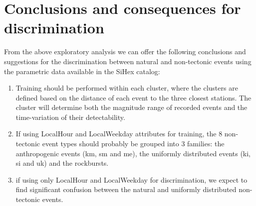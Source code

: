 \section{Conclusions and consequences for discrimination}
From the above exploratory analysis we can offer the following conclusions and
suggestions for the discrimination between natural and non-tectonic events
using the parametric data available in the SiHex catalog:
\begin{enumerate}
\item Training should be performed within each cluster, where the clusters are
defined based on the distance of each event to the three closest stations. The
cluster will determine both the magnitude range of recorded events and the
time-variation of their detectability.
\item If using LocalHour and LocalWeekday attributes for training, the 8
non-tectonic event types should probably be grouped into 3 families: the
anthropogenic events (km, sm and me), the uniformly distributed events (ki, si
and uk) and the rockbursts.
\item if using only LocalHour and LocalWeekday for discrimination, we expect to
find significant confusion between the natural and uniformly distributed
non-tectonic events.
\end{enumerate}
